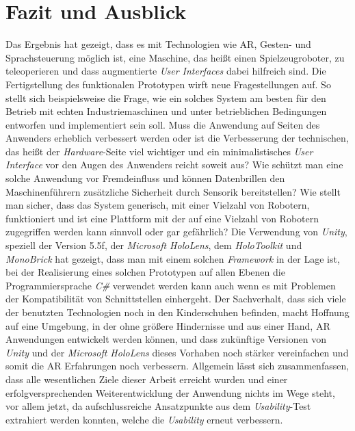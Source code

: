 \chapter{Fazit und Ausblick}
Das Ergebnis hat gezeigt, dass es mit Technologien wie AR, Gesten- und Sprachsteuerung möglich ist, eine Maschine, das heißt einen Spielzeugroboter, zu teleoperieren und dass augmentierte \textit{User Interfaces} dabei hilfreich sind. Die Fertigstellung des funktionalen Prototypen wirft neue Fragestellungen auf. So stellt
sich beispielsweise die Frage, wie ein solches System am besten für den Betrieb mit echten Industriemaschinen und unter betrieblichen Bedingungen entworfen und implementiert sein soll.
Muss die Anwendung auf Seiten des Anwenders erheblich verbessert werden oder ist die Verbesserung der technischen, das heißt der \textit{Hardware}-Seite viel wichtiger und ein minimalistisches \textit{User Interface} vor den Augen des Anwenders reicht soweit aus? Wie schützt man eine solche Anwendung vor Fremdeinfluss und können Datenbrillen den Maschinenführern zusätzliche Sicherheit durch Sensorik bereitstellen? Wie stellt man sicher, dass das System generisch, mit einer Vielzahl von Robotern, funktioniert und ist eine Plattform mit der auf eine Vielzahl von Robotern zugegriffen werden kann sinnvoll oder gar gefährlich?
Die Verwendung von \textit{Unity}, speziell der Version 5.5f, der \textit{Microsoft HoloLens}, dem \textit{HoloToolkit} und \textit{MonoBrick} hat gezeigt, dass man mit einem solchen \textit{Framework} in der Lage ist, bei der Realisierung eines solchen Prototypen auf allen Ebenen die Programmiersprache \textit{C\#} verwendet werden kann auch wenn es mit Problemen der Kompatibilität von Schnittstellen einhergeht. Der Sachverhalt, dass sich viele der benutzten Technologien noch in den Kinderschuhen befinden, macht Hoffnung auf eine Umgebung, in der ohne größere Hindernisse und aus einer Hand, AR Anwendungen entwickelt werden können, und dass zukünftige Versionen von \textit{Unity} und der \textit{Microsoft HoloLens} dieses Vorhaben noch stärker vereinfachen und somit die AR Erfahrungen noch verbessern.
Allgemein lässt sich zusammenfassen, dass alle wesentlichen Ziele dieser Arbeit erreicht wurden und einer erfolgversprechenden Weiterentwicklung der Anwendung nichts im Wege steht, vor allem jetzt, da aufschlussreiche Ansatzpunkte aus dem \textit{Usability}-Test extrahiert werden konnten, welche die \textit{Usability} erneut verbessern.